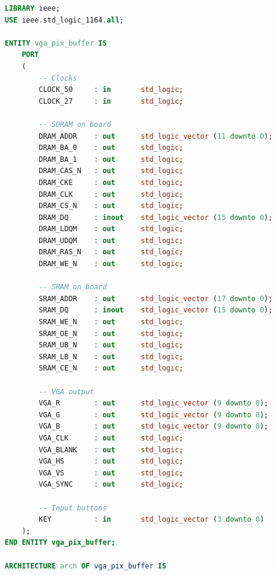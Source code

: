 \documentclass{capstonedoc}
\begin{document}
\begin{lstlisting}[language=vhdl,caption={Sample Top Level VHDL File},label={lst:toplevel},tabsize=1]
LIBRARY ieee;
USE ieee.std_logic_1164.all;

ENTITY vga_pix_buffer IS
	PORT
	(
		-- Clocks
		CLOCK_50     : in       std_logic;
		CLOCK_27     : in       std_logic;

		-- SDRAM on board
		DRAM_ADDR    : out      std_logic_vector (11 downto 0);
		DRAM_BA_0    : out      std_logic;
		DRAM_BA_1    : out      std_logic;
		DRAM_CAS_N   : out      std_logic;
		DRAM_CKE     : out      std_logic;
		DRAM_CLK     : out      std_logic;
		DRAM_CS_N    : out      std_logic;
		DRAM_DQ      : inout    std_logic_vector (15 downto 0);
		DRAM_LDQM    : out      std_logic;
		DRAM_UDQM    : out      std_logic;
		DRAM_RAS_N   : out      std_logic;
		DRAM_WE_N    : out      std_logic;

		-- SRAM on board
		SRAM_ADDR    : out      std_logic_vector (17 downto 0);
		SRAM_DQ      : inout    std_logic_vector (15 downto 0);
		SRAM_WE_N    : out      std_logic;
		SRAM_OE_N    : out      std_logic;
		SRAM_UB_N    : out      std_logic;
		SRAM_LB_N    : out      std_logic;
		SRAM_CE_N    : out      std_logic;

		-- VGA output
		VGA_R        : out      std_logic_vector (9 downto 0);
		VGA_G        : out      std_logic_vector (9 downto 0);
		VGA_B        : out      std_logic_vector (9 downto 0);
		VGA_CLK      : out      std_logic;
		VGA_BLANK    : out      std_logic;
		VGA_HS       : out      std_logic;
		VGA_VS       : out      std_logic;
		VGA_SYNC     : out      std_logic;

		-- Input buttons
		KEY          : in       std_logic_vector (3 downto 0)
	);
END ENTITY vga_pix_buffer;

ARCHITECTURE arch OF vga_pix_buffer IS


\end{lstlisting}
\end{document}
